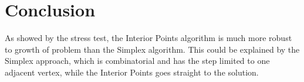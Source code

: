 \documentclass[a4paper]{IEEEtran}
\begin{document}
%






\section{Conclusion}
As showed by the stress test, the Interior Points algorithm is much more robust to growth of problem than the Simplex algorithm. This could be explained by the Simplex approach, which is combinatorial and has the step limited to one adjacent vertex, while the Interior Points goes straight to the solution. 


\end{document}
